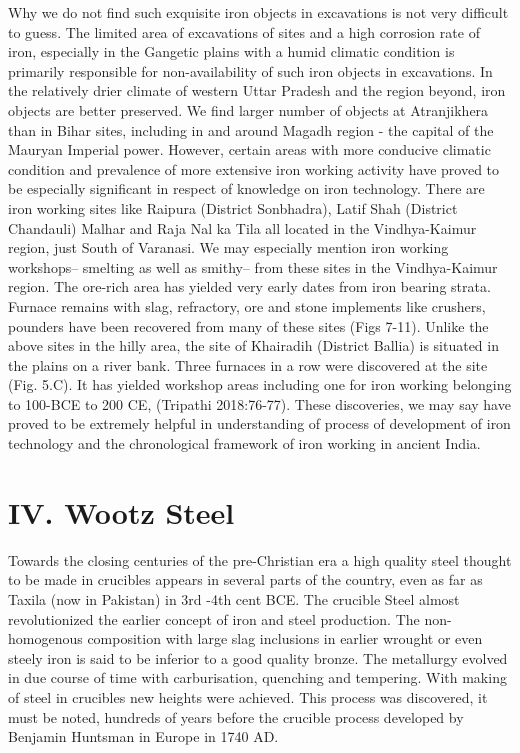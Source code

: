 Why we do not find such exquisite iron objects in excavations is not very difficult to guess. The limited area of excavations of sites and a high corrosion rate of iron, especially in the Gangetic plains with a humid climatic condition is primarily responsible for non-availability of such iron objects in excavations. In the relatively drier climate of western Uttar Pradesh and the region beyond, iron objects are better preserved. We find larger number of objects at Atranjikhera than in Bihar sites, including in and around Magadh region - the capital of the Mauryan Imperial power. However, certain areas with more conducive climatic condition and prevalence of more extensive iron working activity have proved to be especially significant in respect of knowledge on iron technology. There are iron working sites like Raipura (District Sonbhadra), Latif Shah (District Chandauli) Malhar and Raja Nal ka Tila all located in the Vindhya-Kaimur region, just South of Varanasi. We may especially mention iron working workshops– smelting as well as smithy– from these sites in the Vindhya-Kaimur region. The ore-rich area has yielded very early dates from iron bearing strata. Furnace remains with slag, refractory, ore and stone implements like crushers, pounders have been recovered from many of these sites (Figs 7-11). Unlike the above sites in the hilly area, the site of Khairadih (District Ballia) is situated in the plains on a river bank. Three furnaces in a row were discovered at the site (Fig. 5.C). It has yielded workshop areas including one for iron working belonging to 100-BCE to 200 CE, (Tripathi 2018:76-77). These discoveries, we may say have proved to be extremely helpful in understanding of process of development of iron technology and the chronological framework of iron working in ancient India.


\section*{IV. Wootz Steel}

Towards the closing centuries of the pre-Christian era a high quality steel thought to be made in crucibles appears in several parts of the country, even as far as Taxila (now in Pakistan) in 3rd -4th cent BCE. The crucible Steel almost revolutionized the earlier concept of iron and steel production. The non-homogenous composition with large slag inclusions in earlier wrought or even steely iron is said to be inferior to a good quality bronze. The metallurgy evolved in due course of time with carburisation, quenching and tempering. With making of steel in crucibles new heights were achieved. This process was discovered, it must be noted, hundreds of years before the crucible process developed by Benjamin Huntsman in Europe in 1740 AD.

